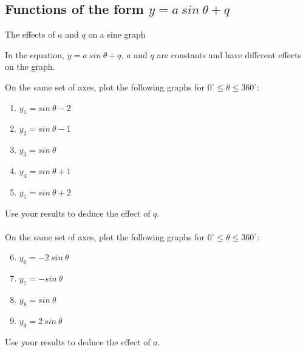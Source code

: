 \subsection*{Functions of the form $y=a~sin~\theta+q$}
\begin{Investigation}{The effects of $a$ and $q$ on a sine graph}

{In the equation, $y=a~sin~\theta+q$, $a$ and $q$ are constants and have different effects on the graph.


On the same set of axes, plot the following graphs for $0^{\circ} \leq \theta \leq 360^{\circ}$:
\begin{enumerate}[noitemsep, label=\textbf{\arabic*}. ] 
\item $y_1=sin~\theta -2$
\item $y_2=sin~\theta -1$
\item $y_3=sin~\theta $
\item $y_4=sin~\theta +1$
\item $y_5=sin~\theta +2$
\end{enumerate}
Use your results to deduce the effect of $q$.\\
\\
On the same set of axes, plot the following graphs for $0^{\circ} \leq \theta \leq 360^{\circ}$:
\begin{enumerate}[noitemsep, label=\textbf{\arabic*}. ] 
\setcounter{enumi}{5}
\item $y_6=-2~sin~\theta $
\item $y_7=-sin~\theta $
\item $y_8=sin~\theta $
\item $y_9=2~sin~\theta $\end{enumerate}
Use your results to deduce the effect of $a$.\\
}
\end{Investigation}
